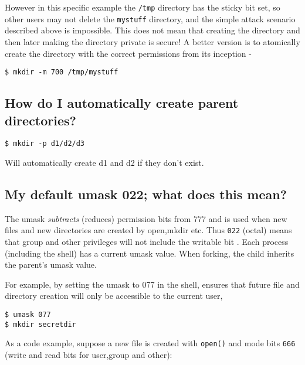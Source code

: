 However in this specific example the \texttt{/tmp} directory has the
sticky bit set, so other users may not delete the \texttt{mystuff}
directory, and the simple attack scenario described above is impossible.
This does not mean that creating the directory and then later making the
directory private is secure! A better version is to atomically create
the directory with the correct permissions from its inception -

\begin{verbatim}
$ mkdir -m 700 /tmp/mystuff
\end{verbatim}

\subsection{How do I automatically create parent
directories?}\label{how-do-i-automatically-create-parent-directories}

\begin{verbatim}
$ mkdir -p d1/d2/d3
\end{verbatim}

Will automatically create d1 and d2 if they don't exist.

\subsection{My default umask 022; what does this
mean?}\label{my-default-umask-022-what-does-this-mean}

The umask \emph{subtracts} (reduces) permission bits from 777 and is
used when new files and new directories are created by open,mkdir etc.
Thus \texttt{022} (octal) means that group and other privileges will not
include the writable bit . Each process (including the shell) has a
current umask value. When forking, the child inherits the parent's umask
value.

For example, by setting the umask to 077 in the shell, ensures that
future file and directory creation will only be accessible to the
current user,

\begin{verbatim}
$ umask 077
$ mkdir secretdir
\end{verbatim}

As a code example, suppose a new file is created with \texttt{open()}
and mode bits \texttt{666} (write and read bits for user,group and
other):

\begin{Shaded}
\begin{Highlighting}[]
\end{Highlighting}
\end{Shaded}

